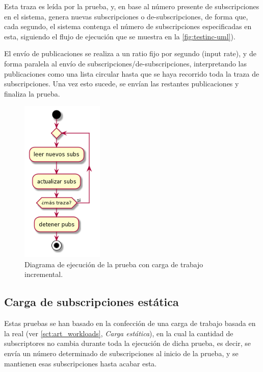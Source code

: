 
Esta traza es leída por la prueba, y, en base al número presente de subscripciones en el sistema,
genera nuevas subscripciones o de-subscripciones, de forma que, cada segundo, el sistema contenga
el número de subscripciones especificadas en esta, siguiendo el flujo de ejecución que se muestra 
en la \autoref{fig:testinc-uml}).

El envío de publicaciones se realiza a un ratio fijo por segundo (input rate), y de forma paralela al envío de 
subscripciones/de-subscripciones, interpretando las publicaciones como una lista circular hasta
que se haya recorrido toda la traza de subscripciones. Una vez esto sucede, se envían las restantes 
publicaciones y finaliza la prueba.

\begin{figure}[htpb]
    \centering
    \includegraphics[width=0.35\textwidth]{images/plantuml/testinc-plantuml.png}
    \caption{Diagrama de ejecución de la prueba con carga de trabajo incremental.}
    \label{fig:testinc-uml}
\end{figure}

\subsection{Carga de subscripciones estática} \label{subsct:desarrollo_pruebas-esilbops_test-static}

Estas pruebas se han basado en la confección de una carga de trabajo basada en
la real (ver \autoref{sct:art_workloads}, \textit{Carga estática}), 
en la cual la cantidad de subscriptores no cambia durante toda la 
ejecución de dicha prueba, es decir, se envía un número determinado de subscripciones
al inicio de la prueba, y se mantienen esas subscripciones hasta acabar esta.


